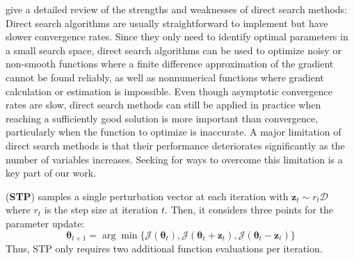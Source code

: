 \textcite{directsearch} give a detailed review of 
the strengths and weaknesses of direct search methods:
Direct search algorithms are usually straightforward to 
implement but have slower convergence rates. Since they 
only need to identify optimal parameters in a small 
search space, 
direct search algorithms can be used to optimize noisy 
or non-smooth functions
where a finite difference approximation of the gradient 
cannot be found reliably, as well as nonnumerical functions
where gradient calculation or estimation is impossible.
Even though asymptotic convergence rates are slow, 
direct search methods can still be applied in practice 
when reaching a sufficiently good solution is more 
important than convergence, particularly when the function 
to optimize is inaccurate. A major limitation of direct 
search methods is that their performance deteriorates 
significantly as the number of variables increases. 
Seeking for ways to overcome this limitation is 
a key part of our work.

 (\textbf{\acs{STP}}) \parencite{stp}
samples a single perturbation vector at each iteration
with $\mathbf{z}_t \sim r_t\mathcal{D}$ where $r_t$ is the step size
at iteration $t$. Then, it considers three points 
for the parameter update: 
\begin{equation}
    \bm{\theta}_{t+1} = \arg\min \{\mathcal{J}(\bm{\theta}_t), \mathcal{J}(\bm{\theta}_t + \mathbf{z}_t), \mathcal{J}(\bm{\theta}_t - \mathbf{z}_t) \}
\end{equation}
Thus, \ac{STP} only requires 
two additional function evaluations per iteration.

